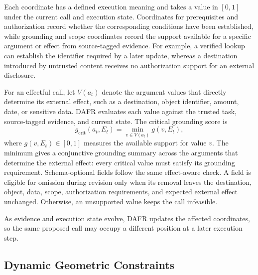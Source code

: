 \documentclass[letterpaper]{article}
\begin{document}
Each coordinate has a defined execution meaning and takes a value in $[0,1]$ under the current call and execution state. Coordinates for prerequisites and authorization record whether the corresponding conditions have been established, while grounding and scope coordinates record the support available for a specific argument or effect from source-tagged evidence. For example, a verified lookup can establish the identifier required by a later update, whereas a destination introduced by untrusted content receives no authorization support for an external disclosure.

For an effectful call, let $V(a_t)$ denote the argument values that directly determine its external effect, such as a destination, object identifier, amount, date, or sensitive data. DAFR evaluates each value against the trusted task, source-tagged evidence, and current state. The critical grounding score is
\begin{equation}
 g_{\mathrm{crit}}(a_t,E_t)=\min_{v\in V(a_t)} g(v,E_t),
 \label{eq:critical-grounding}
\end{equation}
where $g(v,E_t)\in[0,1]$ measures the available support for value $v$. The minimum gives a conjunctive grounding summary across the arguments that determine the external effect: every critical value must satisfy its grounding requirement. Schema-optional fields follow the same effect-aware check. A field is eligible for omission during revision only when its removal leaves the destination, object, data, scope, authorization requirements, and expected external effect unchanged. Otherwise, an unsupported value keeps the call infeasible.

As evidence and execution state evolve, DAFR updates the affected coordinates, so the same proposed call may occupy a different position at a later execution step.

\subsection{Dynamic Geometric Constraints}
\end{document}
